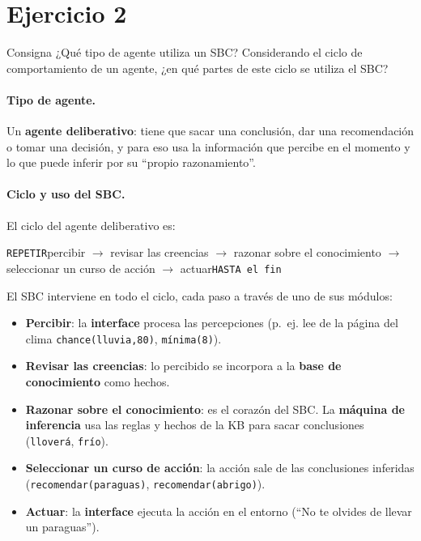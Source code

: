 \documentclass[11pt,a4paper]{article}
\begin{document}
\section{Ejercicio 2}

\begin{enunciado}{Consigna}
¿Qué tipo de agente utiliza un SBC? Considerando el ciclo de comportamiento de un agente, ¿en qué partes de este ciclo se utiliza el SBC?
\end{enunciado}

\paragraph{Tipo de agente.} Un \textbf{agente deliberativo}: tiene que sacar una conclusión, dar una recomendación o tomar una decisión, y para eso usa la información que percibe en el momento y lo que puede inferir por su ``propio razonamiento''.

\paragraph{Ciclo y uso del SBC.} El ciclo del agente deliberativo es:
\begin{center}
\texttt{REPETIR}\quad percibir $\to$ revisar las creencias $\to$ razonar sobre el conocimiento $\to$ seleccionar un curso de acción $\to$ actuar\quad\texttt{HASTA el fin}
\end{center}
El SBC interviene en todo el ciclo, cada paso a través de uno de sus módulos:
\begin{itemize}
  \item \textbf{Percibir}: la \textbf{interface} procesa las percepciones (p.~ej. lee de la página del clima \texttt{chance(lluvia,80)}, \texttt{mínima(8)}).
  \item \textbf{Revisar las creencias}: lo percibido se incorpora a la \textbf{base de conocimiento} como hechos.
  \item \textbf{Razonar sobre el conocimiento}: es el corazón del SBC. La \textbf{máquina de inferencia} usa las reglas y hechos de la KB para sacar conclusiones (\texttt{lloverá}, \texttt{frío}).
  \item \textbf{Seleccionar un curso de acción}: la acción sale de las conclusiones inferidas (\texttt{recomendar(paraguas)}, \texttt{recomendar(abrigo)}).
  \item \textbf{Actuar}: la \textbf{interface} ejecuta la acción en el entorno (``No te olvides de llevar un paraguas'').
\end{itemize}
\end{document}
